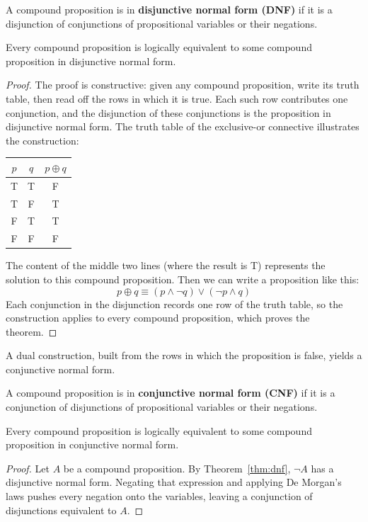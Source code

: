 \begin{definition}
A compound proposition is in \textbf{disjunctive normal form (DNF)} if it is a disjunction of conjunctions of propositional variables or their negations.
\end{definition}

\begin{theorem}\label{thm:dnf}
Every compound proposition is logically equivalent to some compound proposition in disjunctive normal form.
\end{theorem}
\begin{proof}
The proof is constructive: given any compound proposition, write its truth table, then read off the rows in which it is true. Each such row contributes one conjunction, and the disjunction of these conjunctions is the proposition in disjunctive normal form. The truth table of the exclusive-or connective illustrates the construction:
\begin{center}
\begin{tabular}{cc|c}
\toprule
$p$ & $q$ & $p \oplus q$ \\
\midrule
T & T & F \\
T & F & T \\
F & T & T \\
F & F & F \\
\bottomrule
\end{tabular}
\end{center}
The content of the middle two lines (where the result is T) represents the solution to this compound proposition. Then we can write a proposition like this:
$$ p \oplus q \equiv (p \wedge \neg q) \vee (\neg p \wedge q) $$
Each conjunction in the disjunction records one row of the truth table, so the construction applies to every compound proposition, which proves the theorem.
\end{proof}

A dual construction, built from the rows in which the proposition is false, yields a conjunctive normal form.

\begin{definition}
A compound proposition is in \textbf{conjunctive normal form (CNF)} if it is a conjunction of disjunctions of propositional variables or their negations.
\end{definition}

\begin{theorem}
Every compound proposition is logically equivalent to some compound proposition in conjunctive normal form.
\end{theorem}
\begin{proof}
Let $A$ be a compound proposition. By Theorem~\ref{thm:dnf}, $\neg A$ has a disjunctive normal form. Negating that expression and applying De Morgan’s laws pushes every negation onto the variables, leaving a conjunction of disjunctions equivalent to $A$.
\end{proof}


